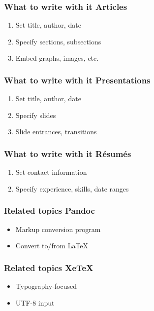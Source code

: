 \documentclass{beamer}
\begin{document}
\begin{frame}[t]
    \frametitle{What to write with it \textendash{} Articles}
    
    \begin{enumerate}
        \item Set title, author, date
        \item Specify sections, subsections
        \item Embed graphs, images, etc.
    \end{enumerate}
\end{frame}

\begin{frame}[t]
    \frametitle{What to write with it \textendash{} Presentations}
    
    \begin{enumerate}
        \item Set title, author, date
        \item Specify slides
        \item Slide entrances, transitions
    \end{enumerate}
\end{frame}

\begin{frame}[t]
    \frametitle{What to write with it \textendash{} R\'{e}sum\'{e}s}
    
    \begin{enumerate}
        \item Set contact information
        \item Specify experience, skills, date ranges
    \end{enumerate}
\end{frame}

\begin{frame}
    \frametitle{Related topics \textendash{} Pandoc}
    \begin{itemize}
        \item Markup conversion program
        \item Convert to/from \LaTeX{}
    \end{itemize}
\end{frame}

\begin{frame}
    \frametitle{Related topics \textendash{} XeTeX}
    \begin{itemize}
        \item Typography-focused
        \item UTF-8 input
    \end{itemize}
\end{frame}
\end{document}
